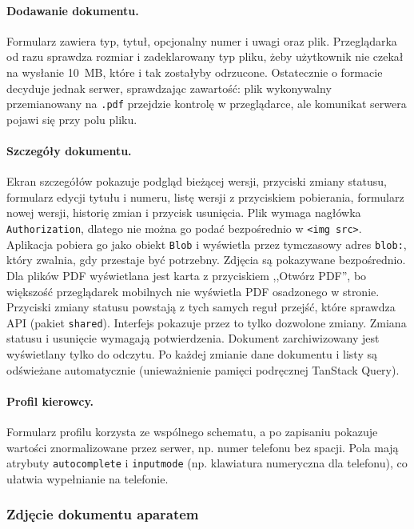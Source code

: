 \paragraph{Dodawanie dokumentu.} Formularz zawiera typ, tytuł, opcjonalny numer
i uwagi oraz plik. Przeglądarka od razu sprawdza rozmiar i zadeklarowany typ
pliku, żeby użytkownik nie czekał na wysłanie 10~MB, które i tak zostałyby
odrzucone. Ostatecznie o formacie decyduje jednak serwer, sprawdzając
zawartość: plik wykonywalny przemianowany na \texttt{.pdf} przejdzie kontrolę
w przeglądarce, ale komunikat serwera pojawi się przy polu pliku.

\paragraph{Szczegóły dokumentu.} Ekran szczegółów pokazuje podgląd bieżącej
wersji, przyciski zmiany statusu, formularz edycji tytułu i numeru, listę
wersji z przyciskiem pobierania, formularz nowej wersji, historię zmian
i przycisk usunięcia. Plik wymaga nagłówka \texttt{Authorization}, dlatego
nie można go podać bezpośrednio w \texttt{<img src>}. Aplikacja pobiera
go jako obiekt \texttt{Blob} i wyświetla przez tymczasowy adres
\texttt{blob:}, który zwalnia, gdy przestaje być potrzebny. Zdjęcia są
pokazywane bezpośrednio. Dla plików PDF wyświetlana jest karta z przyciskiem
,,Otwórz PDF'', bo większość przeglądarek mobilnych nie wyświetla PDF
osadzonego w stronie. Przyciski zmiany statusu powstają z tych samych reguł
przejść, które sprawdza API (pakiet \texttt{shared}). Interfejs pokazuje
przez to tylko dozwolone zmiany. Zmiana statusu i usunięcie wymagają potwierdzenia.
Dokument zarchiwizowany jest wyświetlany tylko do odczytu. Po każdej zmianie
dane dokumentu i listy są odświeżane automatycznie (unieważnienie pamięci
podręcznej TanStack Query).

\paragraph{Profil kierowcy.} Formularz profilu korzysta ze wspólnego schematu,
a po zapisaniu pokazuje wartości znormalizowane przez serwer, np. numer
telefonu bez spacji. Pola mają atrybuty \texttt{autocomplete} i
\texttt{inputmode} (np. klawiatura numeryczna dla telefonu), co ułatwia
wypełnianie na telefonie.

\subsubsection{Zdjęcie dokumentu aparatem}

